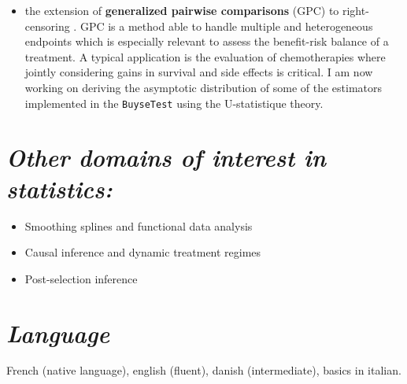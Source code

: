 \documentclass[12pt]{article}
\begin{document}
\clearpage

\begin{itemize}
\item the extension of \textbf{generalized pairwise comparisons} (GPC) to
right-censoring \citep{peron2016extension}. GPC is a method able to
handle multiple and heterogeneous endpoints which is especially
relevant to assess the benefit-risk balance of a treatment. A
typical application is the evaluation of chemotherapies where
jointly considering gains in survival and side effects is
critical. I am now working on deriving the asymptotic distribution
of some of the estimators implemented in the \texttt{BuyseTest} using the
U-statistique theory.
\end{itemize}

\section*{\emph{Other domains of interest in statistics:}}
\label{sec:orga1f01e5}
\begin{itemize}
\item Smoothing splines and functional data analysis
\item Causal inference and dynamic treatment regimes
\item Post-selection inference
\end{itemize}


\section*{\emph{Language}}
\label{sec:org1d50af7}
French (native language), english (fluent), danish (intermediate),
basics in italian.
\end{document}
